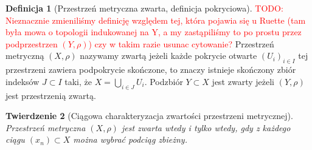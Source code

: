 \documentclass[licencjacka]{pwr_wmat_praca_dyplomowa}
\theoremstyle{plain}
\newtheorem{theorem}{Twierdzenie}
\numberwithin{theorem}{chapter}
\theoremstyle{definition}
\numberwithin{theorem}{chapter}
\newtheorem{definition}[theorem]{Definicja}
\begin{document}
\begin{definition}[Przestrzeń metryczna zwarta, definicja pokryciowa]
\cite[s.~196]{ruette2017chaos}
\textcolor{red}{TODO: Nieznacznie zmieniliśmy definicję względem tej, która pojawia się u Ruette (tam była mowa o topologii indukowanej na Y, a my zastąpiliśmy to po prostu przez podprzestrzen $(Y, \rho)$) czy w takim razie usunac cytowanie?}
Przestrzeń metryczną $(X, \rho)$ nazywamy zwartą jeżeli każde pokrycie otwarte $(U_i)_{i \in I}$ tej przestrzeni zawiera podpokrycie skończone, to znaczy istnieje skończony zbiór indeksów $J \subset I$ taki, że $X = \bigcup_{i \in J}U_i$.
Podzbiór $Y \subset X$ jest zwarty jeżeli $(Y, \rho)$ jest przestrzenią zwartą.
\end{definition}

\begin{theorem}[Ciągowa charakteryzacja zwartości przestrzeni metrycznej]
\label{rownowaznosc_definicji_pokryciowej_i_ciagowej}
Przestrzeń metryczna $(X, \rho)$ jest zwarta wtedy i tylko wtedy, gdy z każdego ciągu $(x_n) \subset X$ można wybrać podciąg zbieżny.
\end{theorem}
\end{document}
